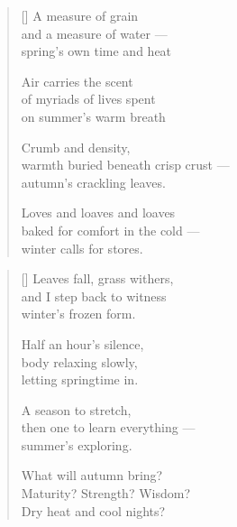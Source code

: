 \begin{verse}[\textwidth]
  A measure of grain\\
  and a measure of water ---\\
  spring's own time and heat

  Air carries the scent\\
  of myriads of lives spent\\
  on summer's warm breath

  Crumb and density,\\
  warmth buried beneath crisp crust ---\\
  autumn's crackling leaves.

  Loves and loaves and loaves\\
  baked for comfort in the cold ---\\
  winter calls for stores.
\end{verse}

\newpage

\begin{verse}[\textwidth]
  Leaves fall, grass withers,\\
  and I step back to witness\\
  winter's frozen form.

  Half an hour's silence,\\
  body relaxing slowly,\\
  letting springtime in.

  A season to stretch,\\
  then one to learn everything ---\\
  summer's exploring.

  What will autumn bring?\\
  Maturity? Strength? Wisdom?\\
  Dry heat and cool nights?
\end{verse}
